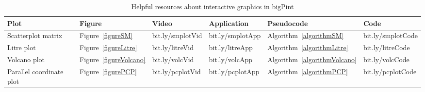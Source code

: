 \documentclass[parskip=full]{bmcart} %
\begin{document}
\begin{backmatter}
\begin{table}[h]
\caption{Helpful resources about interactive graphics in bigPint}
      \begin{tabular}{llllll}
        \hline
        Plot & Figure & Video & Application & Pseudocode & Code\\ \hline
        Scatterplot matrix & Figure~\ref{figureSM} & bit.ly/smplotVid & bit.ly/smplotApp & Algorithm~\ref{algorithmSM} & bit.ly/smplotCode\\
        Litre plot & Figure~\ref{figureLitre} & bit.ly/litreVid & bit.ly/litreApp & Algorithm~\ref{algorithmLitre} & bit.ly/litreCode\\
        Volcano plot & Figure~\ref{figureVolcano} & bit.ly/volcVid & bit.ly/volcApp & Algorithm~\ref{algorithmVolcano} & bit.ly/volcCode\\
        Parallel coordinate plot & Figure~\ref{figurePCP} & bit.ly/pcplotVid & bit.ly/pcplotApp & Algorithm~\ref{algorithmPCP} & bit.ly/pcplotCode\\ \hline
      \end{tabular}
      \label{table:table2}
\end{table}











\clearpage

\DontPrintSemicolon
\begin{algorithm}[H]
\SetInd{0.2em}{1.3em}



\end{algorithm}
\end{backmatter}
\end{document}

